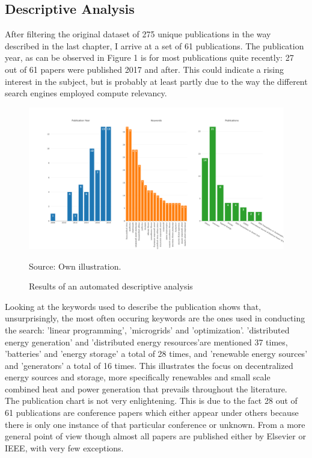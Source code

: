 \documentclass[
	11pt,								%
	DIV10,								%
	a4paper,         					%
	oneside,							%
	headheight=20pt,					%
	footheight=20pt,					%
    parskip=full,						%
    listof=totoc,						%
	bibliography=totoc,					%
	index=totoc,						%
]{scrartcl}
\begin{document}
\subsection{Descriptive Analysis}
After filtering the original dataset of 275 unique publications in the way described in the last chapter, I arrive at a set of 61 publications. The publication year, as can be observed in Figure 1 is for most publications quite recently: 27 out of 61 papers were published 2017 and after. This could indicate a rising interest in the subject, but is probably at least partly due to the way the different search engines employed compute relevancy.  
\begin{figure}[H]
	\centering
	\includegraphics[width=\textwidth]{pictures/Figure_1.png}
	\caption{Results of an automated descriptive analysis}
	\label{descriptive_anaylsis_results}
	\flushleft\quad\quad\footnotesize{Source: Own illustration.}
\end{figure}	
Looking at the keywords used to describe the publication shows that, unsurprisingly, the most often occuring keywords are the ones used in conducting the search: 'linear programming', 'microgrids' and 'optimization'. 'distributed energy generation' and 'distributed energy resources'are mentioned 37 times, 'batteries' and 'energy storage' a total of 28 times, and 'renewable energy sources' and 'generators' a total of 16 times. This illustrates the focus on decentralized energy sources and storage, more specifically renewables and small scale combined heat and power generation that prevails throughout the literature.
\\
The publication chart is not very enlightening. This is due to the fact 28 out of 61 publications are conference papers which either appear under others because there is only one instance of that particular conference or unknown. From a more general point of view though almost all papers are published either by Elsevier or IEEE, with very few exceptions.
\end{document}
